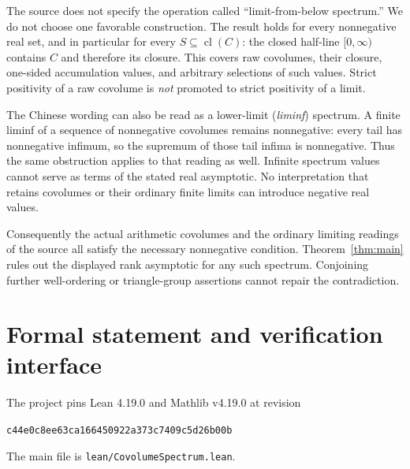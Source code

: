 \documentclass[11pt]{article}
\newcommand{\cl}{\operatorname{cl}}
\begin{document}
The source does not specify the operation called ``limit-from-below
spectrum.'' We do not choose one favorable construction. The result
holds for every nonnegative real set, and in particular for every
$S\subseteq\cl(C)$: the closed half-line $[0,\infty)$ contains $C$ and
therefore its closure. This covers raw covolumes, their closure,
one-sided accumulation values, and arbitrary selections of such values.
Strict positivity of a raw covolume is \emph{not} promoted to strict
positivity of a limit.

The Chinese wording can also be read as a lower-limit (\emph{liminf})
spectrum. A finite liminf of a sequence of nonnegative covolumes remains
nonnegative: every tail has nonnegative infimum, so the supremum of
those tail infima is nonnegative. Thus the same obstruction applies to
that reading as well. Infinite spectrum values cannot serve as terms of
the stated real asymptotic. No interpretation that retains covolumes or
their ordinary finite limits can introduce negative real values.

Consequently the actual arithmetic covolumes and the ordinary limiting
readings of the source all satisfy the necessary nonnegative condition.
Theorem~\ref{thm:main} rules out the displayed rank asymptotic for any such
spectrum. Conjoining further well-ordering or triangle-group assertions
cannot repair the contradiction.

\clearpage
\section{Formal statement and verification interface}
The project pins Lean 4.19.0 and Mathlib v4.19.0 at revision
\begin{center}\small\texttt{c44e0c8ee63ca166450922a373c7409c5d26b00b}\end{center}
The main file is \texttt{lean/CovolumeSpectrum.lean}.
\end{document}
